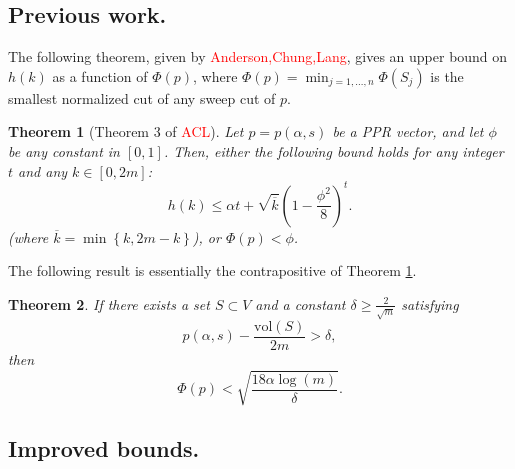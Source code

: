 \documentclass{article}
\newcommand{\vol}{\mathrm{vol}}
\newcommand{\set}[1]{\left\{#1\right\}}
\newcommand{\1}{\mathbf{1}}
\theoremstyle{alden}
\theoremstyle{aldenthm}
\newtheorem{theorem}{Theorem}
\theoremstyle{remark}
\begin{document}
\subsection{Previous work.}

The following theorem, given by \textcolor{red}{Anderson,Chung,Lang}, gives an upper bound on $h(k)$ as a function of $\Phi(p)$, where $\Phi(p) = \min_{j = 1,\ldots,n} \Phi(S_j)$ is the smallest normalized cut of any sweep cut of $p$. 
\begin{theorem}[Theorem 3 of \textcolor{red}{ACL}]
	\label{thm:acl_1}
	Let $p = p(\alpha,s)$ be a PPR vector, and let $\phi$ be any constant in $[0,1]$. Then, either the following bound holds for any integer $t$ and any $k \in [0,2m]$:
	\begin{equation*}
	h(k) \leq \alpha t + \sqrt{\overline{k}}\left(1 - \frac{\phi^2}{8}\right)^t.
	\end{equation*}
	(where $\overline{k} = \min\set{k,2m-k}$), or $\Phi(p) < \phi$. 
\end{theorem}

The following result is essentially the contrapositive of Theorem \ref{thm:acl_1}.
\begin{theorem}
	\label{thm:acl_2}
	If there exists a set $S \subset V$ and a constant $\delta \geq \frac{2}{\sqrt{m}}$ satisfying
	\begin{equation*}
	p(\alpha,s) - \frac{\vol(S)}{2m} > \delta,
	\end{equation*}
	then
	\begin{equation*}
	\Phi(p) < \sqrt{\frac{18\alpha \log(m)}{\delta}}.
	\end{equation*}
\end{theorem}

\subsection{Improved bounds.}
\end{document}
